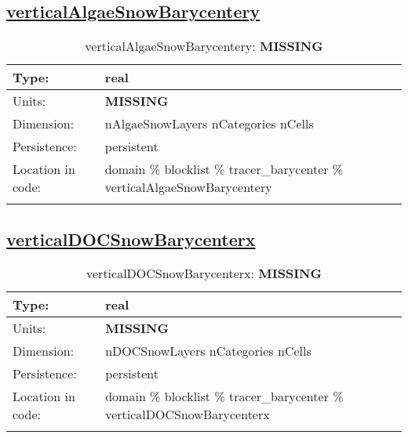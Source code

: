 \subsection[verticalAlgaeSnowBarycentery]{\hyperref[sec:var_tab_tracer_barycenter]{verticalAlgaeSnowBarycentery}}
\label{subsec:var_sec_tracer_barycenter_verticalAlgaeSnowBarycentery}
\begin{center}
\begin{longtable}{| p{2.0in} | p{4.0in} |}
        \hline 
        Type: & real \\
        \hline 
        Units: & {\bf \color{red} MISSING} \\
        \hline 
        Dimension: & nAlgaeSnowLayers nCategories nCells \\
        \hline 
        Persistence: & persistent \\
        \hline 
         Location in code: & domain \% blocklist \% tracer\_barycenter \% verticalAlgaeSnowBarycentery \\
         \hline 
    \caption{verticalAlgaeSnowBarycentery: {\bf \color{red} MISSING}}
\end{longtable}
\end{center}
\subsection[verticalDOCSnowBarycenterx]{\hyperref[sec:var_tab_tracer_barycenter]{verticalDOCSnowBarycenterx}}
\label{subsec:var_sec_tracer_barycenter_verticalDOCSnowBarycenterx}
\begin{center}
\begin{longtable}{| p{2.0in} | p{4.0in} |}
        \hline 
        Type: & real \\
        \hline 
        Units: & {\bf \color{red} MISSING} \\
        \hline 
        Dimension: & nDOCSnowLayers nCategories nCells \\
        \hline 
        Persistence: & persistent \\
        \hline 
         Location in code: & domain \% blocklist \% tracer\_barycenter \% verticalDOCSnowBarycenterx \\
         \hline 
    \caption{verticalDOCSnowBarycenterx: {\bf \color{red} MISSING}}
\end{longtable}
\end{center}
